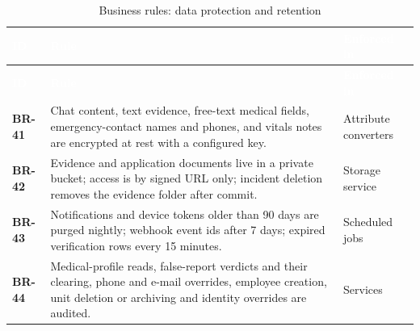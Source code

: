 {\tabfont\rowband
\begin{longtable}{@{}>{\raggedright\arraybackslash}p{}>{\raggedright\arraybackslash}p{}>{\raggedright\arraybackslash}p{}@{}}
\caption{Business rules: data protection and retention}\label{tab:br-data}\\
\rowcolor{najdanavy}\textcolor{white}{\sffamily\bfseries\small ID} & \textcolor{white}{\sffamily\bfseries\small Rule} & \textcolor{white}{\sffamily\bfseries\small Enforced in}\\
\endfirsthead
\rowcolor{najdanavy}\textcolor{white}{\sffamily\bfseries\small ID} & \textcolor{white}{\sffamily\bfseries\small Rule} & \textcolor{white}{\sffamily\bfseries\small Enforced in}\\
\endhead
\bottomrule\endlastfoot
\textbf{BR-41} & Chat content, text evidence, free-text medical fields, emergency-contact names and phones, and vitals notes are encrypted at rest with a configured key. & Attribute converters\\
\textbf{BR-42} & Evidence and application documents live in a private bucket; access is by signed URL only; incident deletion removes the evidence folder after commit. & Storage service\\
\textbf{BR-43} & Notifications and device tokens older than 90 days are purged nightly; webhook event ids after 7 days; expired verification rows every 15 minutes. & Scheduled jobs\\
\textbf{BR-44} & Medical-profile reads, false-report verdicts and their clearing, phone and e-mail overrides, employee creation, unit deletion or archiving and identity overrides are audited. & Services\\
\end{longtable}}
